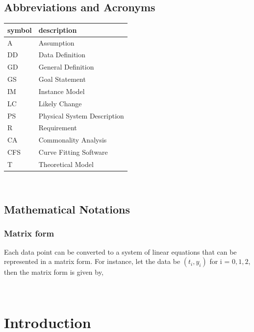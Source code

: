 \documentclass[12pt]{article}
\newcommand{\famname}{CFS} %
\begin{document}
\subsection{Abbreviations and Acronyms}

\renewcommand{\arraystretch}{1.2}
\begin{tabular}{l l} 
  \toprule		
  \textbf{symbol} & \textbf{description}\\
  \midrule 
  A & Assumption\\
  DD & Data Definition\\
  GD & General Definition\\
  GS & Goal Statement\\
  IM & Instance Model\\
  LC & Likely Change\\
  PS & Physical System Description\\
  R & Requirement\\
  CA & Commonality Analysis\\
  \famname & Curve Fitting Software\\
  T & Theoretical Model\\
  \bottomrule
\end{tabular}\\

\subsection{Mathematical Notations}
\subsubsection{Matrix form}
Each data point can be converted to a system of linear equations that can be represented in a matrix form. For instance, let the data be $(t_i,y_i)$ for i = $0,1,2$, then the matrix form is given by,





\newpage

\tableofcontents

~\newpage


\section{Introduction}
\end{document}
